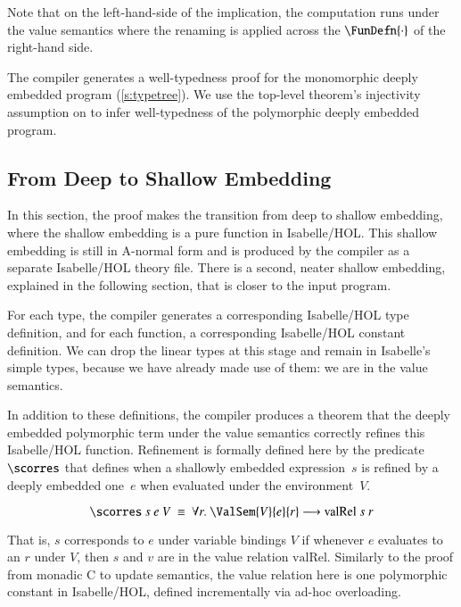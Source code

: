 \documentclass[9pt\ifFinal\else,preprint,nocopyrightspace\fi,\ifAlpha\else natbib,authoryear\fi]{sigplanconf}
\begin{document}
\noindent Note that on the left-hand-side of the implication, the computation
runs under the value semantics where the renaming is applied across
the $\FunDefn{\cdot}$ of the right-hand side.

The compiler generates a well-typedness proof for the monomorphic deeply
embedded program (\autoref{s:typetree}). We use the top-level theorem's injectivity assumption on
\rename to infer well-typedness of the polymorphic deeply embedded program.

\subsection{From Deep to Shallow Embedding}

\newcommand{\extfb}{\mathrm{ext2\_free\_branch}}
\newcommand{\valRel}{\mathrm{valRel}}

In this section, the proof makes the transition from deep to shallow
embedding, where the shallow embedding is a pure function in Isabelle/HOL. 
This shallow embedding is still in A-normal form and is produced
by the compiler as a separate Isabelle/HOL theory file. There is a second,
neater shallow embedding, explained in the following section, that is closer
to the \cdsl input program.

For each \CDSL type, the compiler generates a corresponding Isabelle/HOL type
definition, and for each \CDSL function, a corresponding Isabelle/HOL
constant definition. We can drop the linear types at this stage and remain in
Isabelle's simple types, because we have already made use of them: we are in
the value semantics.


In addition to these definitions, the compiler produces a theorem that the
deeply embedded polymorphic \CDSL term under the value semantics correctly
refines this Isabelle/HOL function. Refinement is formally defined here
by the predicate $\scorres$ that defines when a shallowly embedded
expression~$s$ is refined by a deeply embedded one~$e$ when evaluated
under the environment~$V$.

\begin{definition}
$$\scorres\ s\ e\ V\ \equiv\ \forall r.\ \ValSem{V}{e}{r} \longrightarrow \valRel\ s\ r$$
\end{definition}

\noindent That is, $s$ corresponds to $e$ under variable bindings $V$ if whenever $e$
evaluates to an $r$ under $V$, then $s$ and $v$ are in the value relation
$\valRel$. Similarly to the proof from monadic C to update semantics, the
value relation here is one polymorphic constant in Isabelle/HOL, defined
incrementally via ad-hoc overloading.
\end{document}
